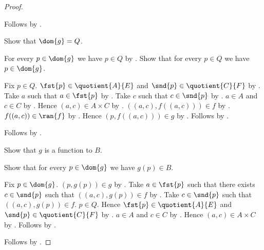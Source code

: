 \begin{proof}
\begin{subproof}
        Follows by .
    \end{subproof}
    Show that $\dom{g}=Q$.
    \begin{subproof}
        For every $p\in\dom{g}$ we have $p\in Q$ by
            .
        Show that for every $p\in Q$ we have $p\in\dom{g}$.
        \begin{subproof}
            Fix $p\in Q$.
            $\fst{p}\in\quotient{A}{E}$ and
                $\snd{p}\in\quotient{C}{F}$ by
                .
            Take $a$ such that $a\in\fst{p}$ by
                .
            Take $c$ such that $c\in\snd{p}$ by
                .
            $a\in A$ and $c\in C$ by .
            Hence $(a,c)\in A\times C$ by .
            $((a,c),f((a,c)))\in f$ by
                .
            $f((a,c))\in\ran{f}$ by .
            Hence $(p,f((a,c)))\in g$ by
                .
            Follows by .
        \end{subproof}
        Follows by .
    \end{subproof}
    Show that $g$ is a function to $B$.
    \begin{subproof}
        Show that for every $p\in\dom{g}$ we have $g(p)\in B$.
        \begin{subproof}
            Fix $p\in\dom{g}$.
            $(p,g(p))\in g$ by .
            Take $a\in\fst{p}$ such that there exists $c\in\snd{p}$
                such that $((a,c),g(p))\in f$ by
                .
            Take $c\in\snd{p}$ such that $((a,c),g(p))\in f$.
            $p\in Q$.
            Hence $\fst{p}\in\quotient{A}{E}$ and
                $\snd{p}\in\quotient{C}{F}$ by
                .
            $a\in A$ and $c\in C$ by .
            Hence $(a,c)\in A\times C$ by .
            Follows by .
        \end{subproof}
    \end{subproof}
    Follows by .
\end{proof}

